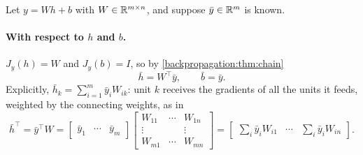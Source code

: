 \begin{notechapter}
Let $y = Wh + b$ with $W\in\mathbb{R}^{m\times n}$, and suppose $\bar y\in\mathbb{R}^m$ is known.

\paragraph{With respect to $h$ and $b$.} $J_y(h) = W$ and $J_y(b) = I$, so by \cref{backpropagation:thm:chain}
\[
  \bar h = W^\top\bar y,\qquad\bar b = \bar y .
\]
Explicitly, $\bar h_k = \sum_{i=1}^m\bar y_iW_{ik}$: unit $k$ receives the gradients of all the units it feeds,
weighted by the connecting weights, as in
\[
  \bar h^\top = \bar y^\top W = \begin{bmatrix}\bar y_1 & \cdots & \bar y_m\end{bmatrix}
  \begin{bmatrix} W_{11} & \cdots & W_{1n}\\ \vdots & & \vdots\\ W_{m1} & \cdots & W_{mn}\end{bmatrix}
  = \begin{bmatrix}\sum_i\bar y_iW_{i1} & \cdots & \sum_i\bar y_iW_{in}\end{bmatrix} .
\]


\end{notechapter}
